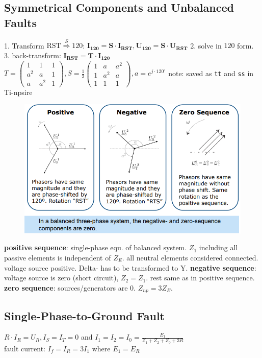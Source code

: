 \documentclass[a4paper,10pt,landscape]{scrartcl}
\begin{document}
\begin{multicols*}{3}
\section{Symmetrical Components and Unbalanced Faults}
1. Transform $\mathrm{RST}\overset{S}{\Rightarrow}120$: $\mathbf{I_{120} = S\cdot I_{RST}}, \mathbf{U_{120} = S\cdot U_{RST}}$ 2. solve in $120$ form. 3. back-transform: $\mathbf{I_{RST} = T\cdot I_{120}}$ \\ $T=\left(\begin{array}{ccc}
1 & 1 & 1 \\
a^2 & a & 1 \\
a & a^2 & 1
\end{array}\right), S=\frac{1}{3}\left(\begin{array}{ccc}
1 & a & a^2 \\
1 & a^2 & a \\
1 & 1 & 1
\end{array}\right), a=e^{j\cdot 120^\circ}$
note: saved as \texttt{tt} and \texttt{ss} in Ti-npsire
\begin{figure}[H]
    \centering
    \includegraphics[width=1\linewidth]{src/symmetrical components.png}
\end{figure}
\vspace{-.5cm}
\textbf{positive sequence}: single-phase equ. of balanced system. $Z_1$ including all passive elements is independent of $Z_E$. all neutral elements considered connected. voltage source positive. Delta- has to be transformed to Y.
\textbf{negative sequence}: voltage source is zero (short circuit), $Z_2=Z_1$. rest same as in positive sequence.
\textbf{zero sequence}: sources/generators are 0. $Z_{np}=3Z_E$. 

\subsection{Single-Phase-to-Ground Fault}
$R\cdot I_R=U_R, I_S=I_T=0$ and $I_1=I_2=I_0=\frac{E_1}{Z_1+Z_2+Z_0+3R}$\\
fault current: $I_f=I_R=3I_1$ where $E_1=E_R$


\end{multicols*}
\end{document}
